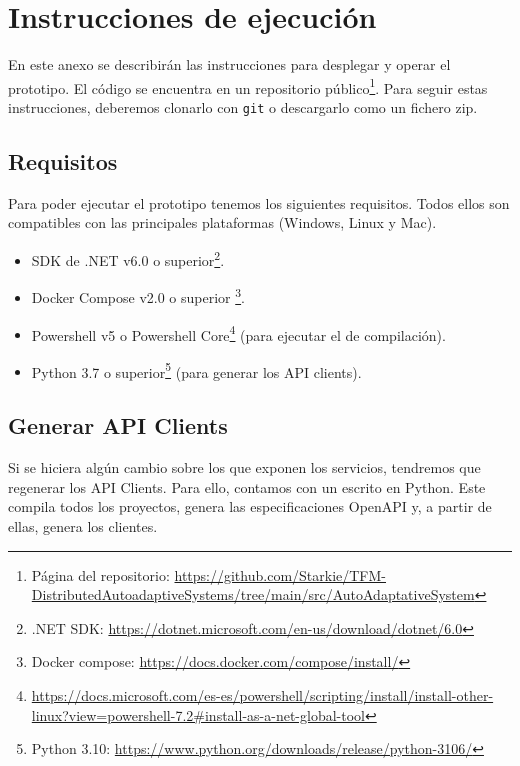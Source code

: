 \chapter{Instrucciones de ejecución}
\label{anx:ejecucion}

En este anexo se describirán las instrucciones para desplegar y operar el prototipo. El código se encuentra en un repositorio público\footnote{Página del repositorio: \url{https://github.com/Starkie/TFM-DistributedAutoadaptiveSystems/tree/main/src/AutoAdaptativeSystem}}. Para seguir estas instrucciones, deberemos clonarlo con \texttt{git} o descargarlo como un fichero zip.

\section{Requisitos}

Para poder ejecutar el prototipo tenemos los siguientes requisitos. Todos ellos son compatibles con las principales plataformas (Windows, Linux y Mac).

\begin{itemize}
  \item SDK de .NET v6.0 o superior\footnote{.NET SDK: \url{https://dotnet.microsoft.com/en-us/download/dotnet/6.0}}.
  \item Docker Compose v2.0 o superior \footnote{Docker compose: \url{https://docs.docker.com/compose/install/}}.
  \item Powershell v5 o Powershell Core\footnote{\url{https://docs.microsoft.com/es-es/powershell/scripting/install/install-other-linux?view=powershell-7.2\#install-as-a-net-global-tool}} (para ejecutar el  de compilación).
  \item Python 3.7 o superior\footnote{Python 3.10: \url{https://www.python.org/downloads/release/python-3106/}} (para generar los API clients).
\end{itemize}

\section{Generar API Clients}

Si se hiciera algún cambio sobre los  que exponen los servicios, tendremos que regenerar los API Clients. Para ello, contamos con un  escrito en Python. Este compila todos los proyectos, genera las especificaciones OpenAPI y, a partir de ellas, genera los clientes.

